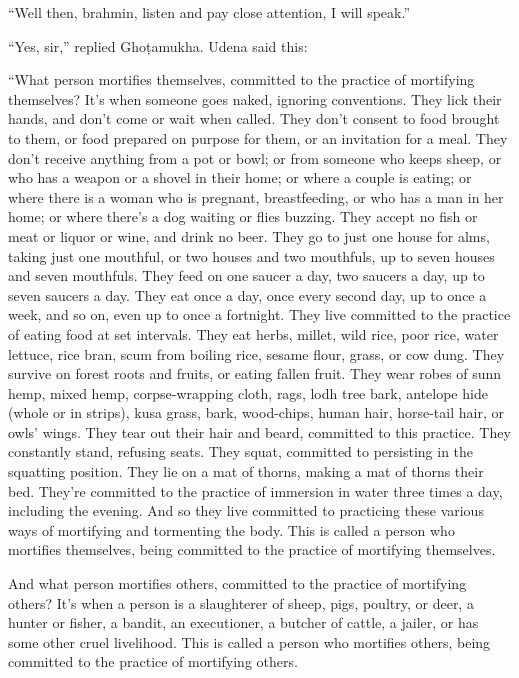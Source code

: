 \documentclass[12pt,openany]{book}%
\begin{document}
“Well then, brahmin, listen and pay close attention, I will speak.” 

“Yes, sir,” replied \textsanskrit{Ghoṭamukha}. Udena said this: 

“What person mortifies themselves, committed to the practice of mortifying themselves? It’s when someone goes naked, ignoring conventions. They lick their hands, and don’t come or wait when called. They don’t consent to food brought to them, or food prepared on purpose for them, or an invitation for a meal. They don’t receive anything from a pot or bowl; or from someone who keeps sheep, or who has a weapon or a shovel in their home; or where a couple is eating; or where there is a woman who is pregnant, breastfeeding, or who has a man in her home; or where there’s a dog waiting or flies buzzing. They accept no fish or meat or liquor or wine, and drink no beer. They go to just one house for alms, taking just one mouthful, or two houses and two mouthfuls, up to seven houses and seven mouthfuls. They feed on one saucer a day, two saucers a day, up to seven saucers a day. They eat once a day, once every second day, up to once a week, and so on, even up to once a fortnight. They live committed to the practice of eating food at set intervals. They eat herbs, millet, wild rice, poor rice, water lettuce, rice bran, scum from boiling rice, sesame flour, grass, or cow dung. They survive on forest roots and fruits, or eating fallen fruit. They wear robes of sunn hemp, mixed hemp, corpse-wrapping cloth, rags, lodh tree bark, antelope hide (whole or in strips), kusa grass, bark, wood-chips, human hair, horse-tail hair, or owls’ wings. They tear out their hair and beard, committed to this practice. They constantly stand, refusing seats. They squat, committed to persisting in the squatting position. They lie on a mat of thorns, making a mat of thorns their bed. They’re committed to the practice of immersion in water three times a day, including the evening. And so they live committed to practicing these various ways of mortifying and tormenting the body. This is called a person who mortifies themselves, being committed to the practice of mortifying themselves. 

And what person mortifies others, committed to the practice of mortifying others? It’s when a person is a slaughterer of sheep, pigs, poultry, or deer, a hunter or fisher, a bandit, an executioner, a butcher of cattle, a jailer, or has some other cruel livelihood. This is called a person who mortifies others, being committed to the practice of mortifying others. 
\end{document}
